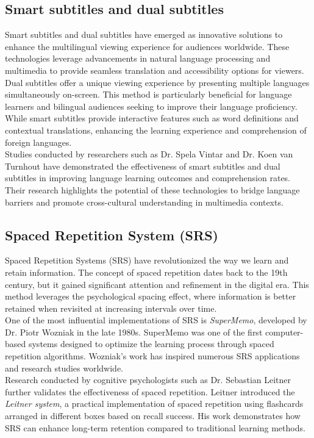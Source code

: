 \documentclass[12pt]{article}
\begin{document}
\subsection{Smart subtitles and dual subtitles }
Smart subtitles and dual subtitles have emerged as innovative solutions to enhance the multilingual viewing experience for audiences worldwide. These technologies leverage advancements in natural language processing and multimedia to provide seamless translation and accessibility options for viewers. \\
Dual subtitles offer a unique viewing experience by presenting multiple languages simultaneously on-screen. This method is particularly beneficial for language learners and bilingual audiences seeking to improve their language proficiency. While smart subtitles provide interactive features such as word definitions and contextual translations, enhancing the learning experience and comprehension of foreign languages. \\
Studies conducted by researchers such as Dr. Spela Vintar and Dr. Koen van Turnhout have demonstrated the effectiveness of smart subtitles and dual subtitles in improving language learning outcomes and comprehension rates. Their research highlights the potential of these technologies to bridge language barriers and promote cross-cultural understanding in multimedia contexts.\\

\subsection{Spaced Repetition System (SRS)}
Spaced Repetition Systems (SRS) have revolutionized the way we learn and retain information. The concept of spaced repetition dates back to the 19th century, but it gained significant attention and refinement in the digital era. This method leverages the psychological spacing effect, where information is better retained when revisited at increasing intervals over time. \\
One of the most influential implementations of SRS is \textit{SuperMemo}, developed by Dr. Piotr Wozniak in the late 1980s. SuperMemo was one of the first computer-based systems designed to optimize the learning process through spaced repetition algorithms. Wozniak's work has inspired numerous SRS applications and research studies worldwide.\\
Research conducted by cognitive psychologists such as Dr. Sebastian Leitner further validates the effectiveness of spaced repetition. Leitner introduced the \textit{Leitner system}, a practical implementation of spaced repetition using flashcards arranged in different boxes based on recall success. His work demonstrates how SRS can enhance long-term retention compared to traditional learning methods.\\
\end{document}
